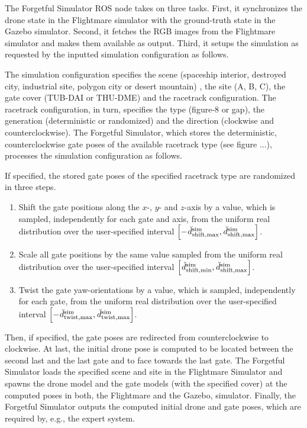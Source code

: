 The Forgetful Simulator ROS node takes on three tasks.
First, it synchronizes the
drone state in the Flightmare simulator with the
ground-truth state in the Gazebo simulator.
Second, it fetches the RGB images from the Flightmare simulator
and makes them available as output.
Third, it setups the simulation
as requested by the inputted 
simulation configuration as follows.

The simulation configuration specifies the scene
(spaceship interior,
destroyed city,
industrial site,
polygon city or
desert mountain)
, the site (A, B, C),
the gate cover (TUB-DAI or THU-DME) and the racetrack configuration.
The racetrack configuration, in turn, specifies 
the type (figure-8 or gap), the generation (deterministic or randomized) 
and the direction (clockwise and counterclockwise).
The Forgetful Simulator, 
which stores the deterministic, 
counterclockwise gate poses
of the available racetrack type (see figure ...), 
processes the simulation configuration as follows.

If specified, 
the stored gate poses of the specified racetrack type are randomized in three steps.
\begin{enumerate}
    \item Shift the gate positions along the $x$-, $y$- and $z$-axis
    by a value, which is sampled, 
    independently for each gate and axis, 
    from the uniform real distribution
    over the user-specified interval 
    $\left[
        -\dist[\user]{\text{sim}}{\text{shift},\mxm}{}{},
        \dist[\user]{\text{sim}}{\text{shift},\mxm}{}{}\right]$.
    \item Scale all gate positions by the same value
    sampled from the uniform real distribution
    over the user-specified interval
    $\left[
        \dist[\user]{\text{sim}}{\text{shift},\mnm}{}{}, 
        \dist[\user]{\text{sim}}{\text{shift},\mxm}{}{}\right]$.
    \item Twist the gate yaw-orientations
    by a value, which is sampled, 
    independently for each gate, 
    from the uniform real distribution
    over the user-specified interval
    $\left[
        -\dist[\user]{\text{sim}}{\text{twist},\mxm}{}{},
        \dist[\user]{\text{sim}}{\text{twist},\mxm}{}{}\right]$.
\end{enumerate}
Then, if specified, the gate poses are redirected 
from counterclockwise to clockwise.
At last, the initial drone pose is computed to be located between
the second last and the last gate and to face towards the last gate.
The Forgetful Simulator loads the specified scene and site in 
the Flightmare Simulator
and spawns the drone model 
and the gate models (with the specified cover)
at the computed poses
in both, the Flightmare and the Gazebo, simulator.
Finally, the Forgetful Simulator
outputs the computed initial drone and gate poses,
which are required by, e.g., the expert system.




